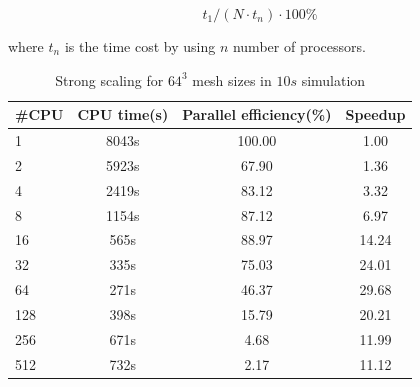 \[
t_{1}/(N\cdot t_{n})\cdot100\%
\]

where $t_{n}$ is the time cost by using $n$ number of processors.

\begin{table}[H]
\begin{centering}
\begin{tabular}{l c c c}
\hline 
\hline 
\#CPU & CPU time(s) & Parallel efficiency(\%) & Speedup\tabularnewline
\hline 
1   & 8043s & 100.00 & 1.00\tabularnewline
2   & 5923s & 67.90  & 1.36\tabularnewline
4   & 2419s & 83.12  & 3.32\tabularnewline
8   & 1154s & 87.12  & 6.97\tabularnewline
16  & 565s  & 88.97  & 14.24\tabularnewline
32  & 335s  & 75.03  & 24.01\tabularnewline
64  & 271s  & 46.37  & 29.68\tabularnewline
128 & 398s  & 15.79  & 20.21\tabularnewline
256 & 671s  & 4.68   & 11.99\tabularnewline
512 & 732s  & 2.17   & 11.12\tabularnewline
\hline 
\end{tabular}

\end{centering}
\caption{Strong scaling for $64^{3}$ mesh sizes in $10s$ simulation}
\end{table}

\newpage{}